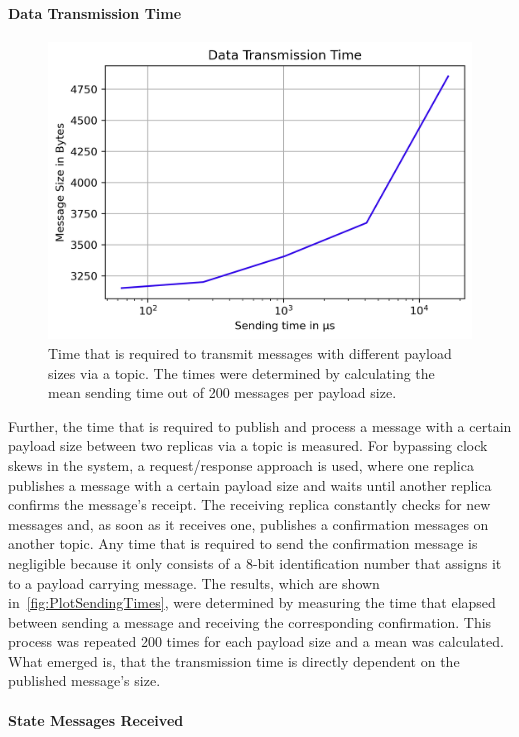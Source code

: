 \paragraph{Data Transmission Time}
\begin{figure}[!hb]
	\centering
	\includegraphics[width=0.75\linewidth]{images/plots/sendingTimes}
	\caption{Time that is required to transmit messages with different payload sizes via a  topic. The times were determined by calculating the mean sending time out of 200 messages per payload size.}
	\label{fig:PlotSendingTimes}
\end{figure}


Further, the time that is required to publish and process a message with a certain payload size between two replicas via a  topic is measured.
For bypassing clock skews in the system, a request/response approach is used, where one replica publishes a message with a certain payload size and waits until another replica confirms the message's receipt.
The receiving replica constantly checks for new messages and, as soon as it receives one, publishes a confirmation messages on another topic.
Any time that is required to send the confirmation message is negligible because it only consists of a 8-bit identification number that assigns it to a payload carrying message.
The results, which are shown in~\autoref{fig:PlotSendingTimes}, were determined by measuring the time that elapsed between sending a message and receiving the corresponding confirmation.
This process was repeated 200 times for each payload size and a mean was calculated.
What emerged is, that the transmission time is directly dependent on the published message's size.



\paragraph{State Messages Received}

